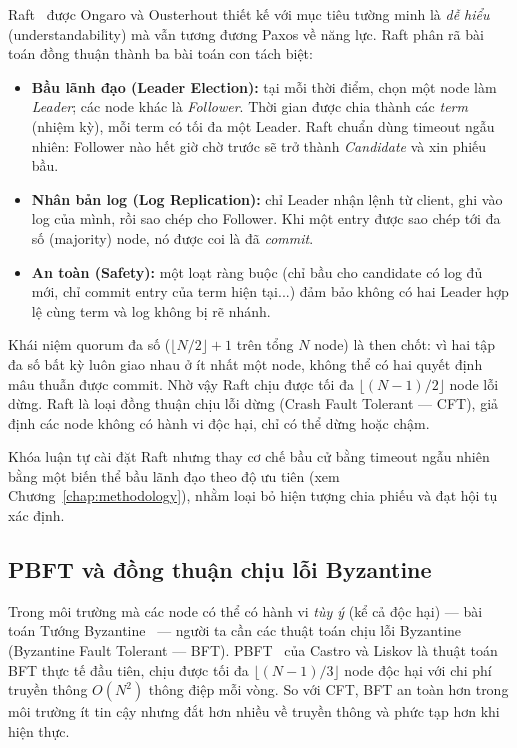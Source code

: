 Raft~\cite{ongaro2014raft} được Ongaro và Ousterhout thiết kế với mục tiêu
tường minh là \textit{dễ hiểu} (understandability) mà vẫn tương đương Paxos về
năng lực. Raft phân rã bài toán đồng thuận thành ba bài toán con tách biệt:

\begin{itemize}
  \item \textbf{Bầu lãnh đạo (Leader Election):} tại mỗi thời điểm, chọn một
  node làm \textit{Leader}; các node khác là \textit{Follower}. Thời gian được
  chia thành các \textit{term} (nhiệm kỳ), mỗi term có tối đa một Leader. Raft
  chuẩn dùng timeout ngẫu nhiên: Follower nào hết giờ chờ trước sẽ trở
  thành \textit{Candidate} và xin phiếu bầu.
  \item \textbf{Nhân bản log (Log Replication):} chỉ Leader nhận lệnh từ client,
  ghi vào log của mình, rồi sao chép cho Follower. Khi một entry được sao chép
  tới đa số (majority) node, nó được coi là đã \textit{commit}.
  \item \textbf{An toàn (Safety):} một loạt ràng buộc (chỉ bầu cho candidate có
  log đủ mới, chỉ commit entry của term hiện tại...) đảm bảo không có hai Leader
  hợp lệ cùng term và log không bị rẽ nhánh.
\end{itemize}

Khái niệm quorum đa số ($\lfloor N/2 \rfloor + 1$ trên tổng $N$ node)
là then chốt: vì hai tập đa số bất kỳ luôn giao nhau ở ít nhất một node, không
thể có hai quyết định mâu thuẫn được commit. Nhờ vậy Raft chịu được tối đa
$\lfloor (N-1)/2 \rfloor$ node lỗi dừng. Raft là loại đồng thuận
chịu lỗi dừng (Crash Fault Tolerant --- CFT), giả định các node không
có hành vi độc hại, chỉ có thể dừng hoặc chậm.

Khóa luận tự cài đặt Raft nhưng thay cơ chế bầu cử bằng timeout ngẫu
nhiên bằng một biến thể bầu lãnh đạo theo độ ưu tiên (xem
Chương~\ref{chap:methodology}), nhằm loại bỏ hiện tượng chia phiếu và đạt hội tụ
xác định.

\subsection{PBFT và đồng thuận chịu lỗi Byzantine}

Trong môi trường mà các node có thể có hành vi \textit{tùy ý} (kể cả độc hại) ---
bài toán Tướng Byzantine~\cite{lamport1982byzantine} --- người ta cần các thuật
toán chịu lỗi Byzantine (Byzantine Fault Tolerant --- BFT).
PBFT~\cite{castro1999pbft} của Castro và Liskov là thuật toán BFT thực tế đầu
tiên, chịu được tối đa $\lfloor (N-1)/3 \rfloor$ node độc hại với chi phí truyền
thông $O(N^2)$ thông điệp mỗi vòng. So với CFT, BFT an toàn hơn trong môi trường
ít tin cậy nhưng đắt hơn nhiều về truyền thông và phức tạp hơn khi hiện thực.

